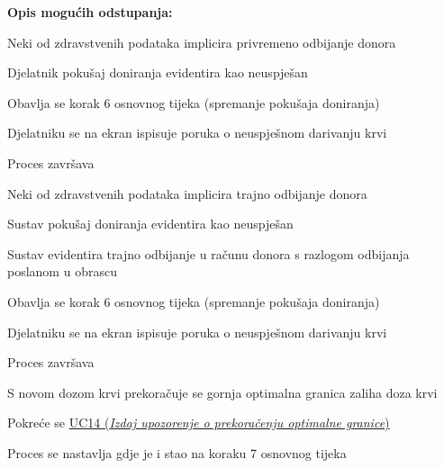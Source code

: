 \begin{packed_item}
						\item  \textbf{Opis mogućih odstupanja:}
						
						\item[] \begin{packed_item}
	
							\item[4.a] Neki od zdravstvenih podataka implicira privremeno odbijanje donora
							\begin{packed_enum}
								\item Djelatnik pokušaj doniranja evidentira kao neuspješan
								\item Obavlja se korak 6 osnovnog tijeka (spremanje pokušaja doniranja)
								\item Djelatniku se na ekran ispisuje poruka o neuspješnom darivanju krvi
								\item Proces završava
							\end{packed_enum}
							
							\item[4.b] Neki od zdravstvenih podataka implicira trajno odbijanje donora
							\begin{packed_enum}
								\item Sustav pokušaj doniranja evidentira kao neuspješan
								\item Sustav evidentira trajno odbijanje u računu donora s razlogom odbijanja poslanom u obrascu
								\item Obavlja se korak 6 osnovnog tijeka (spremanje pokušaja doniranja)
								\item Djelatniku se na ekran ispisuje poruka o neuspješnom darivanju krvi
								\item Proces završava
							\end{packed_enum}
							
							\item[7] S novom dozom krvi prekoračuje se gornja optimalna granica zaliha doza krvi
							\begin{packed_enum}
							    \item Pokreće se \hyperref[UC14]{UC14 (\textit{Izdaj upozorenje o prekoračenju optimalne granice})}
								\item Proces se nastavlja gdje je i stao na koraku 7 osnovnog tijeka
							\end{packed_enum}
							
						\end{packed_item}
						
					\end{packed_item}
					
